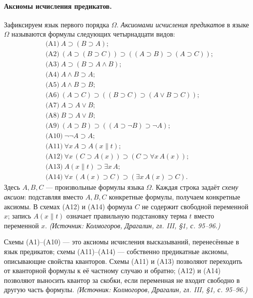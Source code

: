 \documentclass[a4paper,12pt]{article}
\begin{document}
\paragraph{Аксиомы исчисления предикатов.} Зафиксируем язык первого порядка \(\Omega\). \emph{Аксиомами исчисления предикатов} в языке \(\Omega\) называются формулы следующих четырнадцати видов:
\[
\begin{aligned}
&\text{(A1)}\ A\supset(B\supset A);\\
&\text{(A2)}\ (A\supset(B\supset C))\supset((A\supset B)\supset(A\supset C));\\
&\text{(A3)}\ A\supset(B\supset A\wedge B);\\
&\text{(A4)}\ A\wedge B\supset A;\\
&\text{(A5)}\ A\wedge B\supset B;\\
&\text{(A6)}\ (A\supset C)\supset((B\supset C)\supset(A\vee B\supset C));\\
&\text{(A7)}\ A\supset A\vee B;\\
&\text{(A8)}\ B\supset A\vee B;\\
&\text{(A9)}\ (A\supset B)\supset((A\supset\neg B)\supset\neg A);\\
&\text{(A10)}\ \neg\neg A\supset A;\\
&\text{(A11)}\ \forall x\,A\supset A(x\|t);\\
&\text{(A12)}\ \forall x\,(C\supset A(x))\supset(C\supset\forall x\,A(x));\\
&\text{(A13)}\ A(x\|t)\supset\exists x\,A;\\
&\text{(A14)}\ \forall x\,(A(x)\supset C)\supset(\exists x\,A(x)\supset C).
\end{aligned}
\]
Здесь \(A,B,C\) — произвольные формулы языка \(\Omega\). Каждая строка задаёт \emph{схему аксиом}: подставляя вместо \(A,B,C\) конкретные формулы, получаем конкретные аксиомы. В схемах (A12) и (A14) формула \(C\) не содержит свободной переменной \(x\); запись \(A(x\|t)\) означает правильную подстановку терма \(t\) вместо переменной \(x\).
\textit{(Источник: Колмогоров, Драгалин, гл. III, §1, с. 95--96.)}

Схемы (A1)–(A10) — это аксиомы исчисления высказываний, перенесённые в язык предикатов; схемы (A11)–(A14) — собственно предикатные аксиомы, описывающие свойства кванторов. Схемы (A11) и (A13) позволяют переходить от кванторной формулы к её частному случаю и обратно; (A12) и (A14) позволяют выносить квантор за скобки, если переменная не входит свободно в другую часть формулы.
\textit{(Источник: Колмогоров, Драгалин, гл. III, §1, с. 95--96.)}
\end{document}
